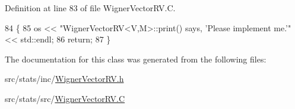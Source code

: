 Definition at line 83 of file Wigner\-Vector\-R\-V.\-C.


\begin{DoxyCode}
84 \{
85   os << \textcolor{stringliteral}{"WignerVectorRV<V,M>::print() says, 'Please implement me.'"} << std::endl;
86   \textcolor{keywordflow}{return};
87 \}
\end{DoxyCode}


The documentation for this class was generated from the following files\-:\begin{DoxyCompactItemize}
\item 
src/stats/inc/\hyperlink{_wigner_vector_r_v_8h}{Wigner\-Vector\-R\-V.\-h}\item 
src/stats/src/\hyperlink{_wigner_vector_r_v_8_c}{Wigner\-Vector\-R\-V.\-C}\end{DoxyCompactItemize}
